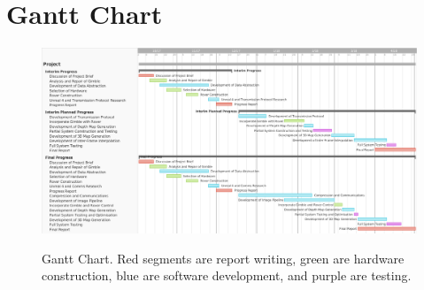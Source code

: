 \chapter{Gantt Chart}
\label{appendix:gantt}

\begin{landscape}
\begin{figure}[ht]
    \begin{center}
    \includegraphics[width=1.5\textwidth]{Figures/ganttfull.png}
    \label{fig:GanttChart}
    \caption[Gantt Chart]{Gantt Chart. Red segments are report writing, green are hardware construction, blue are software development, and purple are testing.}
    \end{center}
\end{figure}
\end{landscape}